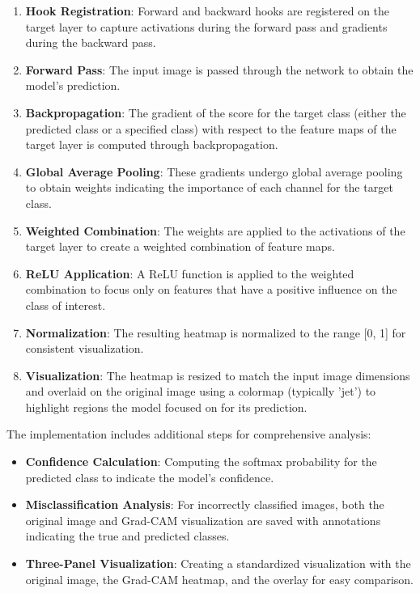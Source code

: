 \documentclass[a4paper,12pt]{article}
\begin{document}
\begin{enumerate}
    \item \textbf{Hook Registration}: Forward and backward hooks are registered on the target layer to capture activations during the forward pass and gradients during the backward pass.
    
    \item \textbf{Forward Pass}: The input image is passed through the network to obtain the model's prediction.
    
    \item \textbf{Backpropagation}: The gradient of the score for the target class (either the predicted class or a specified class) with respect to the feature maps of the target layer is computed through backpropagation.
    
    \item \textbf{Global Average Pooling}: These gradients undergo global average pooling to obtain weights indicating the importance of each channel for the target class.
    
    \item \textbf{Weighted Combination}: The weights are applied to the activations of the target layer to create a weighted combination of feature maps.
    
    \item \textbf{ReLU Application}: A ReLU function is applied to the weighted combination to focus only on features that have a positive influence on the class of interest.
    
    \item \textbf{Normalization}: The resulting heatmap is normalized to the range [0, 1] for consistent visualization.
    
    \item \textbf{Visualization}: The heatmap is resized to match the input image dimensions and overlaid on the original image using a colormap (typically 'jet') to highlight regions the model focused on for its prediction.
\end{enumerate}

The implementation includes additional steps for comprehensive analysis:

\begin{itemize}
    \item \textbf{Confidence Calculation}: Computing the softmax probability for the predicted class to indicate the model's confidence.
    
    \item \textbf{Misclassification Analysis}: For incorrectly classified images, both the original image and Grad-CAM visualization are saved with annotations indicating the true and predicted classes.
    
    \item \textbf{Three-Panel Visualization}: Creating a standardized visualization with the original image, the Grad-CAM heatmap, and the overlay for easy comparison.
\end{itemize}
\end{document}
